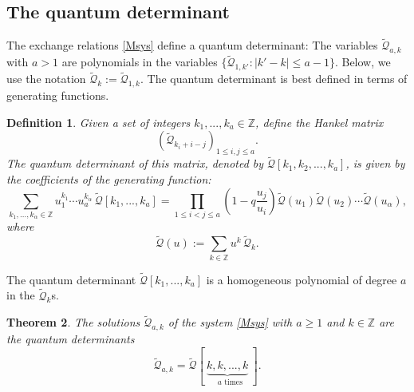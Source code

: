\documentclass[12pt]{amsart}
\newtheorem{thm}{Theorem}[section]
\newtheorem{defn}[thm]{Definition}
\newcommand{\Z}{{\mathbb Z}}
\newcommand{\Q}{{\mathcal Q}}
\newcommand{\al}{{\alpha}}
\numberwithin{equation}{section}
\numberwithin{table}{section}
\begin{document}
\subsection{The quantum determinant}
The exchange relations 
\eqref{Msys} define a quantum determinant: The variables $\widetilde\Q_{a,k}$ with $a>1$ are polynomials in
the variables $\{\widetilde\Q_{1,k'}: |k'-k| \leq a-1\}$. Below, we use the notation $\widetilde\Q_{k}:=\widetilde\Q_{1,k}$.
The quantum determinant is best defined in terms of generating functions.
\begin{defn} Given a set of integers $k_1,...,k_a\in \Z$, define the Hankel matrix 
\begin{equation}\label{hank}
(\widetilde\Q_{k_i+i-j})_{1\leq i,j\leq a} .
\end{equation}
The quantum determinant of this matrix,  
denoted by $\widetilde\Q[k_1,k_2,...,k_a]$,
is given by the coefficients of the generating function:
$$\sum_{k_1,...,k_\al\in \Z} u_1^{k_1}\cdots u_a^{k_\al}\, {\widetilde\Q}[k_1,...,k_a]=
\prod_{1\leq i<j \leq a} \left(1-q\frac{u_j}{u_i}\right) { \widetilde\Q}(u_1) {\widetilde\Q}(u_2)\cdots  {\widetilde\Q}(u_\al),$$
where 
$${\widetilde\Q}(u):= \sum_{k\in \Z} u^k\, \widetilde\Q_{k}.$$
\end{defn}
The quantum determinant $\widetilde\Q[k_1,...,k_a]$ is a homogeneous polynomial of degree $a$ in the $\widetilde\Q_{k}$s. 

\begin{thm}{\cite{DFK16}}
The solutions $\widetilde\Q_{a,k}$ of the system \eqref{Msys} with $a\geq 1$ and $k\in \Z$ are the quantum determinants
$$\widetilde\Q_{a,k}= 
\widetilde\Q[\ \underbrace{ k,k,...,k }_{\text{ $a$ times}}\ ] .$$
\end{thm}
\end{document}
